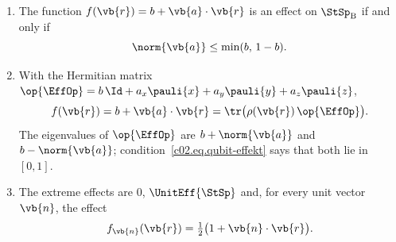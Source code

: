\begin{proposition}\label{c02.prop.qubit-effekte}
  \begin{enumerate}
    \item The function $f(\vb{r}) = b + \vb{a}\cdot\vb{r}$ is an effect on
      $\StSp_{\mathrm{B}}$ if and only if
      \begin{equation}\label{c02.eq.qubit-effekt}
        \norm{\vb{a}} \leq \min(b,\, 1-b) .
      \end{equation}
    \item With the Hermitian matrix
      $\op{\EffOp} = b\, \Id + a_x \pauli{x} + a_y \pauli{y} + a_z \pauli{z}$,
      \begin{equation}\label{c02.eq.spurformel}
        f(\vb{r}) = b + \vb{a}\cdot\vb{r} = \tr\bigl(\rho(\vb{r})\, \op{\EffOp}\bigr) .
      \end{equation}
      The eigenvalues of $\op{\EffOp}$ are $b + \norm{\vb{a}}$ and $b - \norm{\vb{a}}$;
      condition~\eqref{c02.eq.qubit-effekt} says that both lie in $[0,1]$.
    \item The extreme effects are $0$, $\UnitEff{\StSp}$ and, for every unit vector
      $\vb{n}$, the effect
      \begin{equation}\label{c02.eq.qubit-extremal}
        f_{\vb{n}}(\vb{r}) = \tfrac12\bigl(1 + \vb{n}\cdot\vb{r}\bigr) .
      \end{equation}
  \end{enumerate}
\end{proposition}
